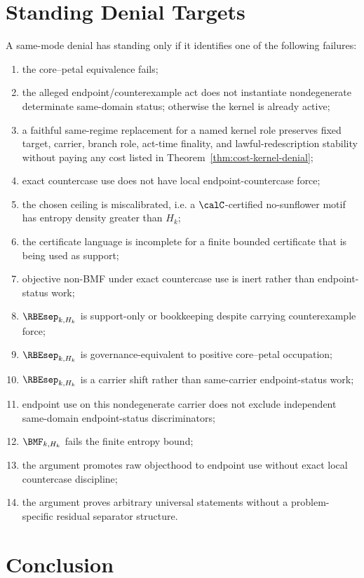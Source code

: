 \documentclass[11pt]{article}
\begin{document}
\section{Standing Denial Targets}

A same-mode denial has standing only if it identifies one of the following failures:
\begin{enumerate}[label=(D\arabic*)]
\item the core--petal equivalence fails;
\item the alleged endpoint/counterexample act does not instantiate nondegenerate determinate same-domain status; otherwise the kernel is already active;
\item a faithful same-regime replacement for a named kernel role preserves fixed target, carrier, branch role, act-time finality, and lawful-redescription stability without paying any cost listed in Theorem~\ref{thm:cost-kernel-denial};
\item exact countercase use does not have local endpoint-countercase force;
\item the chosen ceiling is miscalibrated, i.e. a \(\calC\)-certified no-sunflower motif has entropy density greater than \(H_k\);
\item the certificate language is incomplete for a finite bounded certificate that is being used as support;
\item objective non-BMF under exact countercase use is inert rather than endpoint-status work;
\item \(\RBEsep_{k,H_k}\) is support-only or bookkeeping despite carrying counterexample force;
\item \(\RBEsep_{k,H_k}\) is governance-equivalent to positive core--petal occupation;
\item \(\RBEsep_{k,H_k}\) is a carrier shift rather than same-carrier endpoint-status work;
\item endpoint use on this nondegenerate carrier does not exclude independent same-domain endpoint-status discriminators;
\item \(\BMF_{k,H_k}\) fails the finite entropy bound;
\item the argument promotes raw objecthood to endpoint use without exact local countercase discipline;
\item the argument proves arbitrary universal statements without a problem-specific residual separator structure.
\end{enumerate}

\section{Conclusion}
\end{document}
